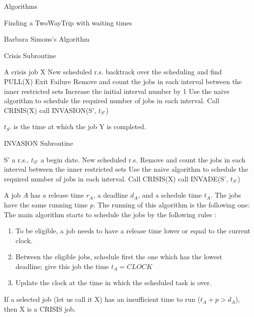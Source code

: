 \documentclass[a4paper,10pt]{report}
\begin{document}
\begin{chapter}{Algorithms}
\begin{section}{Finding a TwoWayTrip with waiting times}
\begin{subsection}{Barbara Simons's Algorithm}
 \begin{algorithm}[H]
\caption{Crisis Subroutine}
\begin{algorithmic}
\REQUIRE A crisis job X
\ENSURE New scheduled r.s.
\STATE backtrack over the scheduling and find PULL(X)
\STATE Exit Failure
\ENDIF 
\STATE Remove and count the jobs in each interval between the inner restricted sets
\STATE Increase the initial interval number by 1
\STATE Use the naive algorithm to schedule the required number of jobs in each interval.
\STATE Call CRISIS(X)
\ELSE
{}
\STATE call INVASION(S', $t_{S'}$)
\ENDIF
\ENDIF
\ENDWHILE

\end{algorithmic}
\end{algorithm}
$t_{S'}$ is the time at which the job Y is completed.


 \begin{algorithm}[H]
\caption{INVASION Subroutine}
\begin{algorithmic}
\REQUIRE S' a r.s., $t_{S'}$ a begin date.
\ENSURE New scheduled r.s.
\STATE Remove and count the jobs in each interval between the inner restricted sets
\STATE Use the naive algorithm to schedule the required number of jobs in each interval.
\STATE Call CRISIS(X)
\ELSE
{}
\STATE call INVADE(S', $t_{S'}$)
\ENDIF
\ENDIF
\ENDWHILE

\end{algorithmic}
\end{algorithm}


A job $A$ has a release time $r_A$, a deadline $d_A$, and a schedule time $t_A$. The jobs have the same running time $p$.
The running of this algorithm is the following one:
The main algorithm starts to schedule the jobs by the following rules :
\begin{enumerate}
 \item To be eligible, a job needs to have a release time lower or equal to the current clock.
 \item Between the eligible jobs, schedule first the one which has the lowest deadline; give this job the time $t_A = CLOCK$
 \item Update the clock at the time in which the scheduled task is over.
\end{enumerate}

If a selected job (let us call it X) has an insufficient time to run ($t_A + p > d_A$), then X is a CRISIS job.


\end{subsection}
\end{section}
\end{chapter}
\end{document}
